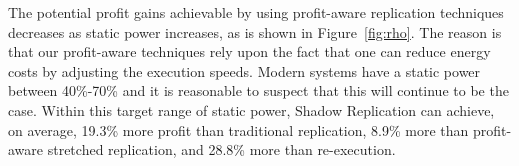 \begin{figure}[!h]	
	\begin{center}
	\end{center}

\end{figure}


The potential profit gains achievable by using profit-aware
replication techniques decreases as static power increases, as is shown
in Figure~\ref{fig:rho}. The reason is that our profit-aware
techniques rely upon the fact that one can reduce energy costs by
adjusting the execution speeds. Modern systems have a static power between 40\%-70\% and
it is reasonable to suspect that this will continue to be the case. Within
this target range of static power, Shadow Replication can achieve, on
average, 19.3\% more profit than traditional replication, 8.9\% more
than profit-aware stretched replication, and 28.8\% more than re-execution.


